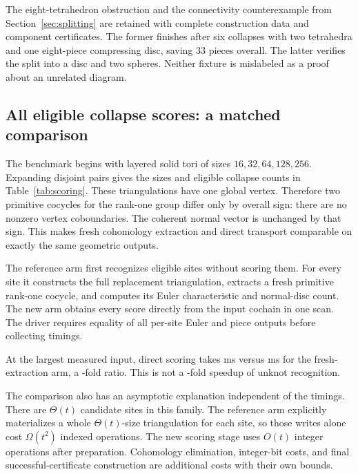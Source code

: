 The eight-tetrahedron obstruction and the connectivity counterexample
from Section~\ref{sec:splitting} are retained with complete construction
data and component certificates. The former finishes after six collapses
with two tetrahedra and one eight-piece compressing disc, saving 33 pieces
overall. The latter verifies the split into a disc and two spheres.
Neither fixture is mislabeled as a proof about an unrelated diagram.

\subsection{All eligible collapse scores: a matched comparison}

The benchmark begins with layered solid tori of sizes
$16,32,64,128,256$. Expanding disjoint pairs gives the sizes and eligible
collapse counts in Table~\ref{tab:scoring}. These triangulations have one
global vertex. Therefore two primitive cocycles for the rank-one group
differ only by overall sign: there are no nonzero vertex coboundaries.
The coherent normal vector is unchanged by that sign. This makes fresh
cohomology extraction and direct transport comparable on exactly the same
geometric outputs.

The reference arm first recognizes eligible sites without scoring them.
For every site it constructs the full replacement triangulation, extracts
a fresh primitive rank-one cocycle, and computes its Euler characteristic
and normal-disc count. The new arm obtains every score directly from the
input cochain in one scan. The driver requires equality of all per-site
Euler and piece outputs before collecting timings.

\begin{table}[htbp]
\centering

\caption{Scoring all eligible collapses. Times include each arm's stated
preparation and discovery work. The speedup is the ratio of median times.
Height bits grow with the layered family.}
\label{tab:scoring}
\end{table}

At the largest measured input, direct scoring takes
\ScoringLocalMax{} ms versus \ScoringRestartMax{} ms for the fresh-extraction
arm, a \ScoringSpeedupMax{}-fold ratio. This is not a
\ScoringSpeedupMax{}-fold speedup of unknot recognition.

The comparison also has an asymptotic explanation independent of the
timings. There are $\Theta(t)$ candidate sites in this family. The reference
arm explicitly materializes a whole $\Theta(t)$-size triangulation for
each site, so those writes alone cost $\Omega(t^2)$ indexed operations.
The new scoring stage uses $O(t)$ integer operations after preparation.
Cohomology elimination, integer-bit costs, and final successful-certificate
construction are additional costs with their own bounds.

